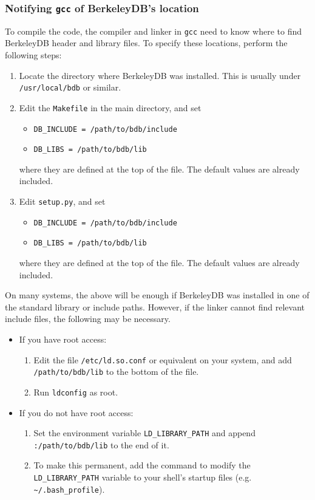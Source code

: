 \documentclass[10pt, letterpaper]{article}
\begin{document}
\subsubsection{Notifying \texttt{gcc} of BerkeleyDB's location}
To compile the code, the compiler and linker in \texttt{gcc} need to know where to find BerkeleyDB
header and library files. To specify these locations, perform the following steps:
\begin{enumerate}
\item Locate the directory where BerkeleyDB was installed. This is usually under \texttt{/usr/local/bdb} or similar.
\item Edit the \texttt{Makefile} in the main directory, and set 
    \begin{itemize}
    \item \texttt{DB\_INCLUDE = /path/to/bdb/include}
    \item \texttt{DB\_LIBS = /path/to/bdb/lib}
    \end{itemize}
where they are defined at the top of the file. The default values are already included.
\item Edit \texttt{setup.py}, and set
    \begin{itemize}
    \item \texttt{DB\_INCLUDE = /path/to/bdb/include}
    \item \texttt{DB\_LIBS = /path/to/bdb/lib}
    \end{itemize}
where they are defined at the top of the file. The default values are already included.
\end{enumerate}
On many systems, the above will be enough if BerkeleyDB was installed in one of the standard library or include
paths. However, if the linker cannot find relevant include files, the following may be necessary.
\begin{itemize}
\item If you have root access:
\begin{enumerate}
\item Edit the file \texttt{/etc/ld.so.conf} or equivalent on your system, and add
    \texttt{/path/to/bdb/lib} to the bottom of the file.
\item Run \texttt{ldconfig} as root.
\end{enumerate}
\item If you do not have root access:
\begin{enumerate}
\item Set the environment variable \texttt{LD\_LIBRARY\_PATH} and append \texttt{:/path/to/bdb/lib} to the end of it.
\item To make this permanent, add the command to modify the \texttt{LD\_LIBRARY\_PATH} variable to your shell's startup files (e.g. \texttt{\textasciitilde/.bash\_profile}).
\end{enumerate}
\end{itemize}
\end{document}

